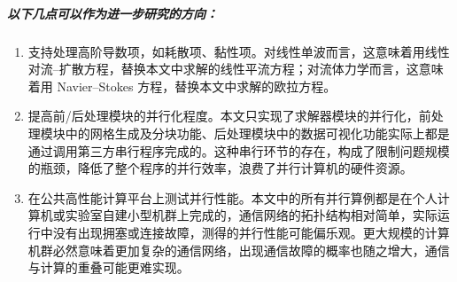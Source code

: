\subparagraph*{以下几点可以作为进一步研究的方向：}
\begin{enumerate}[wide]
\item 支持处理高阶导数项，如耗散项、黏性项。对线性单波而言，这意味着用线性对流–扩散方程，替换本文中求解的线性平流方程；对流体力学而言，这意味着用
Navier–Stokes 方程，替换本文中求解的欧拉方程。 
\item 提高前/后处理模块的并行化程度。本文只实现了求解器模块的并行化，前处理模块中的网格生成及分块功能、后处理模块中的数据可视化功能实际上都是通过调用第三方串行程序完成的。这种串行环节的存在，构成了限制问题规模的瓶颈，降低了整个程序的并行效率，浪费了并行计算机的硬件资源。
\item 在公共高性能计算平台上测试并行性能。本文中的所有并行算例都是在个人计算机或实验室自建小型机群上完成的，通信网络的拓扑结构相对简单，实际运行中没有出现拥塞或连接故障，测得的并行性能可能偏乐观。更大规模的计算机群必然意味着更加复杂的通信网络，出现通信故障的概率也随之增大，通信与计算的重叠可能更难实现。
\end{enumerate}
%

